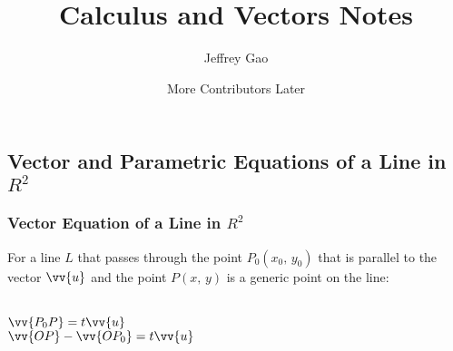 \documentclass{article}
\title{\vspace{-3ex}Calculus and Vectors Notes}
\author{Jeffrey Gao\and More Contributors Later}
\begin{document}
	\maketitle
	\tableofcontents
	\newpage
	\setcounter{section}{8}
	\subsection{Vector and Parametric Equations of a Line in $R^2$}
	\subsubsection{Vector Equation of a Line in $R^2$}
	For a line $L$ that passes through the point $P_0(x_0,\,y_0)$ that is parallel to the vector $\vv{u}$ and the point $P(x,\,y)$ is a generic point on the line:\\
	\\
	$\vv{P_0P}=t\vv{u}$\\
	$\vv{OP}-\vv{OP_0}=t\vv{u}$
\end{document}
